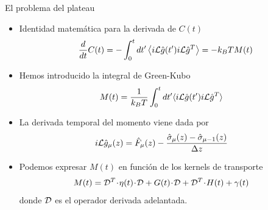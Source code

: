 \documentclass{beamer}
\newcommand{\esc}{\!\cdot\!}
\newcommand{\llangle}{\left\langle}
\newcommand{\rrangle}{\right\rangle}
\begin{document}

\begin{frame}{El problema del plateau}
  \begin{itemize}
    \item<1-> Identidad matemática para la derivada de $C(t)$
\begin{align}
  \frac{d}{dt}C(t)
=-  \int_0^t dt' \llangle i{\cal L}\hat{g}(t') i{\cal L}\hat{g}^T\rrangle
=-  k_BT M(t)
\nonumber
\end{align}
\item<2-> Hemos introducido la integral de Green-Kubo 
\begin{align}
M(t)&= \frac{1}{k_BT}\int_0^t dt'\langle i{\cal L}\hat{g}(t')i{\cal L} \hat{g}^T\rangle
\nonumber
\end{align}
\item<3-> La derivada temporal del momento viene dada por
\begin{align}
  i{\cal L}\hat{g}_\mu(z) &=\hat{F}_\mu(z)-\frac{\hat{\sigma}_\mu(z)-\hat{\sigma}_{\mu-1}(z)}{\Delta z}
\nonumber
\end{align}
\item<4-> Podemos expresar $M(t)$ en función de los kernels de transporte 
\begin{align}
  {M}(t)&={\cal D}^T\esc{\eta}(t)\esc {\cal D}+{G}(t)\esc {\cal D}+{\cal D}^T\esc{H}(t)+{\gamma}(t)
\nonumber
\end{align}
donde ${\cal D}$ es el operador derivada adelantada. 
  \end{itemize}
\end{frame}
\end{document}
